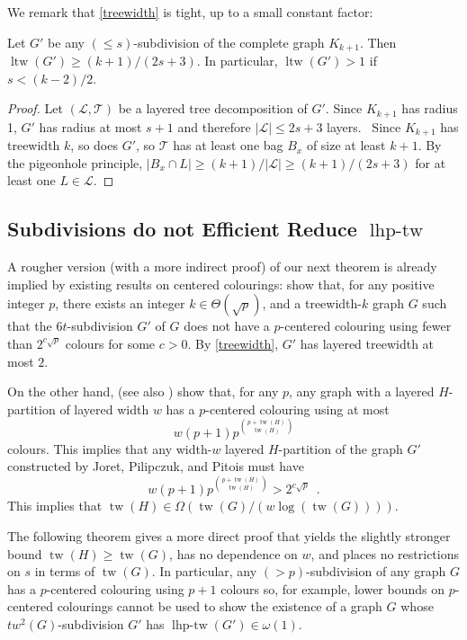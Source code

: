\documentclass[kpfonts]{patmorin}
\DeclareMathOperator{\tw}{tw}
\DeclareMathOperator{\ltw}{ltw}
\DeclareMathOperator{\lhptw}{lhp-tw}
\begin{document}
We remark that \cref{treewidth} is tight, up to a small constant factor:
\begin{obs}
    Let $G'$ be any $(\le\!\!s)$-subdivision of the complete graph $K_{k+1}$.  Then $\ltw(G')\ge (k+1)/(2s+3)$. In particular, $\ltw(G')>1$ if $s < (k-2)/2$.
\end{obs}

\begin{proof}
    Let $(\mathcal{L},\mathcal{T})$ be a layered tree decomposition of $G'$.    Since $K_{k+1}$ has radius 1, $G'$ has radius at most $s+1$ and therefore $|\mathcal{L}|\le 2s+3$ layers.  Since $K_{k+1}$ has treewidth $k$, so does $G'$, so $\mathcal{T}$ has at least one bag $B_x$ of size at least $k+1$.  By the pigeonhole principle, $|B_x\cap L|\ge (k+1)/\mathcal{|L|}\ge (k+1)/(2s+3)$ for at least one $L\in\mathcal{L}$.
\end{proof}


\subsection{Subdivisions do not Efficient Reduce $\lhptw$}

A rougher version (with a more indirect proof) of our next theorem is already implied by existing results on centered colourings: \citet{joret.pilipczuk.ea:two} show that, for any positive integer $p$, there exists an integer $k\in \Theta(\sqrt{p})$, and a treewidth-$k$ graph $G$ such that the $6t$-subdivision $G'$ of $G$ does not have a $p$-centered colouring using fewer than $2^{c\sqrt{p}}$ colours for some $c>0$.  By \cref{treewidth}, $G'$ has layered treewidth at most $2$.


On the other hand, \citet{debski.felsner.ea:improved} (see also \citet{dujmovic.morin.ea:structure}) show that, for any $p$, any graph with a layered $H$-partition of layered width $w$ has a $p$-centered colouring using at most
\[
    w(p+1)p^{\binom{p+\tw(H)}{\tw(H)}}
\]
colours.  This implies that any width-$w$ layered $H$-partition of the graph $G'$ constructed by Joret, Pilipczuk, and Pitois must have
\[
    w(p+1)p^{\binom{p+\tw(H)}{\tw(H)}} > 2^{c\sqrt{p}} \enspace.
\]
This implies that $\tw(H) \in \Omega(\tw(G)/(w\log(\tw(G))))$.

The following theorem gives a more direct proof that yields the slightly stronger bound $\tw(H) \ge \tw(G)$, has no dependence on $w$, and places no restrictions on $s$ in terms of $\tw(G)$. In particular, any $(>\!\!p)$-subdivision of any graph $G$ has a $p$-centered colouring using $p+1$ colours so, for example, lower bounds on $p$-centered colourings cannot be used to show the existence of a graph $G$ whose $tw^2(G)$-subdivision $G'$ has $\lhptw(G')\in \omega(1)$.
\end{document}
